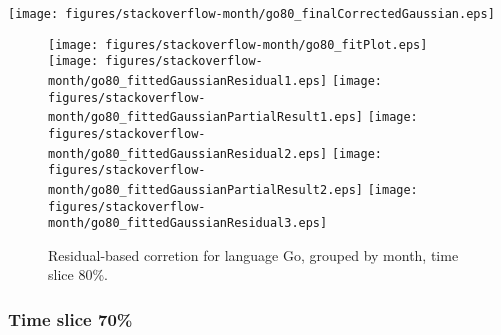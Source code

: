 \begin{center}
{\texttt{[image: figures/stackoverflow-month/go80\_finalCorrectedGaussian.eps]}}
\end{center}

\FloatBarrier

\begin{figure}[t]
\centering
{}
{\texttt{[image: figures/stackoverflow-month/go80\_fitPlot.eps]}}
{\texttt{[image: figures/stackoverflow-month/go80\_fittedGaussianResidual1.eps]}}
{\texttt{[image: figures/stackoverflow-month/go80\_fittedGaussianPartialResult1.eps]}}
{\texttt{[image: figures/stackoverflow-month/go80\_fittedGaussianResidual2.eps]}}
{\texttt{[image: figures/stackoverflow-month/go80\_fittedGaussianPartialResult2.eps]}}
{\texttt{[image: figures/stackoverflow-month/go80\_fittedGaussianResidual3.eps]}}
\caption{Residual-based corretion for language Go, grouped by month, time slice 80\%.}
\end{figure}


\FloatBarrier


\subsubsection{Time slice 70\%}

